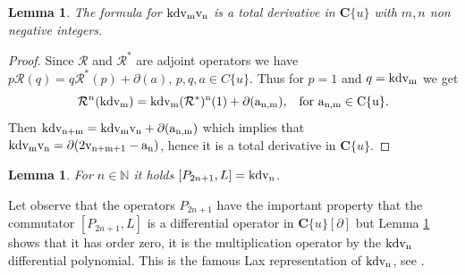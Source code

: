\documentclass[a4paper,12pt]{article}
\newcommand{\cR}{\mathcal{R}}
\newcommand{\bbN}{\mathbb{N}}
\newcommand{\coC}{\mathbf{C}}
\def\kdv{\rm kdv}
\newtheorem{lem}[thm]{Lemma}
\begin{document}
\begin{lem}\label{lem-v}
The formula for  $\kdv_m v_n$ is a total derivative in $\coC\{u\}$ with $m, n$ non negative integers.
\end{lem}
\begin{proof} Since $\cR$ and $\cR^*$ are adjoint operators we have $p\cR (q)=q\cR^*(p)+\partial (a)$, $p,q,a\in C\{u\}$. Thus for $p=1$ and $q=\kdv_m$ we get
\[\cR^{n}(\kdv_m )=\kdv_m (\cR^*)^n (1)+\partial (a_{n,m}),\,\,\,\mbox{ for } a_{n,m}\in C\{u\}.\]
Then $ \kdv_{n+m} =\kdv_m  v_n +\partial (a_{n,m} )$ which implies that $\kdv_m  v_n  = \partial ( 2 v_{n+m+1} - a_n )$, hence it is a total derivative in $\coC\{u\}$.
\end{proof}

\begin{lem}\label{lem-fs}
For $n\in \bbN$ it holds $[P_{2n+1},L]=\kdv_n$.
\end{lem}




Let observe that the operators $P_{2n+1}$ have the important property that the commutator  $[P_{2n+1},L]$ is a differential operator in $\coC\{u\}[\partial]$ but Lemma \ref{lem-fs} shows that it has order zero, it is the multiplication operator by the $\kdv_n$ differential polynomial. This is the famous Lax representation of $\kdv_n$, see \cite{GH, Novikov}. 
\end{document}
